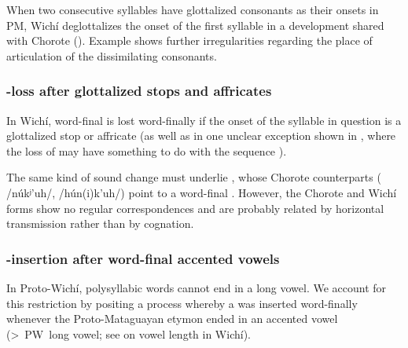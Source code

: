 When two consecutive syllables have glottalized consonants as their onsets in PM, Wichí deglottalizes the onset of the first syllable in a development shared with Chorote (). Example  shows further irregularities regarding the place of articulation of the dissimilating consonants.

\begin{exe}
    \ex \monkparakeet
    \ex \hornero \label{wi-degl-hornero}
    \ex \saliva
    \ex \hiccup
\end{exe}

\subsubsection{-loss after glottalized stops and affricates}\label{wi-h-loss}

In Wichí, word-final  is lost word-finally if the onset of the syllable in question is a glottalized stop or affricate (as well as in one unclear exception shown in , where the loss of  may have something to do with the sequence ).

\begin{exe}
    \ex \monkparakeet
    \ex \hornero
    \ex \whiteegret
    \ex \rat \label{wi-rat-h-loss}
\end{exe}

The same kind of sound change must underlie , whose Chorote counterparts ( /núkʲ'uh/,  /hún(i)k'uh/) point to a word-final . However, the Chorote and Wichí forms show no regular correspondences and are probably related by horizontal transmission rather than by cognation.

\subsubsection{-insertion after word-final accented vowels}\label{wi-h-insertion}
In Proto-Wichí, polysyllabic words cannot end in a long vowel. We account for this restriction by positing a process whereby a  was inserted word-finally whenever the Proto-Mataguayan etymon ended in an accented vowel (>~PW~long vowel; see  on vowel length in Wichí).

\begin{exe}
    \ex \armadillo
    \ex \savannahhawk
\end{exe}

